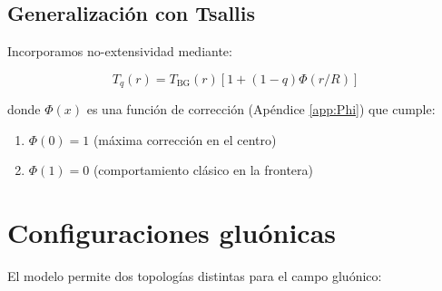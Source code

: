 \subsection{Generalización con Tsallis}
Incorporamos no-extensividad mediante:

\begin{equation}
T_q(r) = T_{\text{BG}}(r)\left[1 + (1-q)\Phi(r/R)\right] \label{eq-Tq}
\end{equation}

donde $\Phi(x)$ es una función de corrección (Apéndice \ref{app:Phi}) que cumple:


\begin{enumerate}[ i. ]
    \item $\Phi(0) = 1$ (máxima corrección en el centro)
    \item $\Phi(1) = 0$ (comportamiento clásico en la frontera)
\end{enumerate}

\section{Configuraciones gluónicas}
El modelo permite dos topologías distintas para el campo gluónico:

